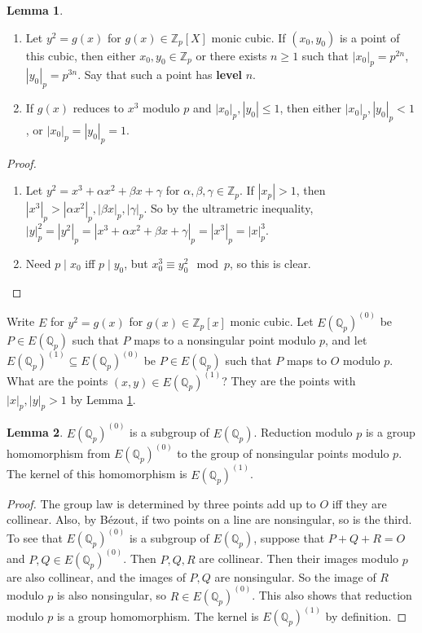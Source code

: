 \documentclass{article}
\newcommand{\Z}{\mathbb{Z}}
\newcommand{\Q}{\mathbb{Q}}
\newcommand{\rb}[1]{\left( #1 \right)}
\renewcommand{\sb}[1]{\left[ #1 \right]}
\newcommand{\abs}[1]{\left\lvert #1 \right\rvert}
\theoremstyle{definition}\newtheorem{definition}{Definition}[section]
\theoremstyle{definition}\newtheorem{remark}[definition]{Remark}
\theoremstyle{definition}\newtheorem*{example}{Example}
\theoremstyle{definition}\newtheorem*{note}{Note}
\newtheorem{lemma}[definition]{Lemma}
\begin{document}
\begin{lemma}
\label{lem:7.1}
\hfill
\begin{enumerate}
\item Let $ y^2 = g\rb{x} $ for $ g\rb{x} \in \Z_p\sb{X} $ monic cubic. If $ \rb{x_0, y_0} $ is a point of this cubic, then either $ x_0, y_0 \in \Z_p $ or there exists $ n \ge 1 $ such that $ \abs{x_0}_p = p^{2n} $, $ \abs{y_0}_p = p^{3n} $. Say that such a point has \textbf{level} $ n $.
\item If $ g\rb{x} $ reduces to $ x^3 $ modulo $ p $ and $ \abs{x_0}_p, \abs{y_0} \le 1 $, then either $ \abs{x_0}_p, \abs{y_0}_p < 1 $, or $ \abs{x_0}_p = \abs{y_0}_p = 1 $.
\end{enumerate}
\end{lemma}

\begin{proof}
\hfill
\begin{enumerate}
\item Let $ y^2 = x^3 + \alpha x^2 + \beta x + \gamma $ for $ \alpha, \beta, \gamma \in \Z_p $. If $ \abs{x_p} > 1 $, then $ \abs{x^3}_p > \abs{\alpha x^2}_p, \abs{\beta x}_p, \abs{\gamma}_p $. So by the ultrametric inequality, $ \abs{y}_p^2 = \abs{y^2}_p = \abs{x^3 + \alpha x^2 + \beta x + \gamma}_p = \abs{x^3}_p = \abs{x}_p^3 $.
\item Need $ p \mid x_0 $ iff $ p \mid y_0 $, but $ x_0^3 \equiv y_0^2 \mod p $, so this is clear.
\end{enumerate}
\end{proof}

Write $ E $ for $ y^2 = g\rb{x} $ for $ g\rb{x} \in \Z_p\sb{x} $ monic cubic. Let $ E\rb{\Q_p}^{\rb{0}} $ be $ P \in E\rb{\Q_p} $ such that $ P $ maps to a nonsingular point modulo $ p $, and let $ E\rb{\Q_p}^{\rb{1}} \subseteq E\rb{\Q_p}^{\rb{0}} $ be $ P \in E\rb{\Q_p} $ such that $ P $ maps to $ O $ modulo $ p $. What are the points $ \rb{x, y} \in E\rb{\Q_p}^{\rb{1}} $? They are the points with $ \abs{x}_p, \abs{y}_p > 1 $ by Lemma \ref{lem:7.1}.

\begin{lemma}
\label{lem:7.2}
$ E\rb{\Q_p}^{\rb{0}} $ is a subgroup of $ E\rb{\Q_p} $. Reduction modulo $ p $ is a group homomorphism from $ E\rb{\Q_p}^{\rb{0}} $ to the group of nonsingular points modulo $ p $. The kernel of this homomorphism is $ E\rb{\Q_p}^{\rb{1}} $.
\end{lemma}

\begin{proof}
The group law is determined by three points add up to $ O $ iff they are collinear. Also, by Bézout, if two points on a line are nonsingular, so is the third. To see that $ E\rb{\Q_p}^{\rb{0}} $ is a subgroup of $ E\rb{\Q_p} $, suppose that $ P + Q + R = O $ and $ P, Q \in E\rb{\Q_p}^{\rb{0}} $. Then $ P, Q, R $ are collinear. Then their images modulo $ p $ are also collinear, and the images of $ P, Q $ are nonsingular. So the image of $ R $ modulo $ p $ is also nonsingular, so $ R \in E\rb{\Q_p}^{\rb{0}} $. This also shows that reduction modulo $ p $ is a group homomorphism. The kernel is $ E\rb{\Q_p}^{\rb{1}} $ by definition.
\end{proof}
\end{document}
